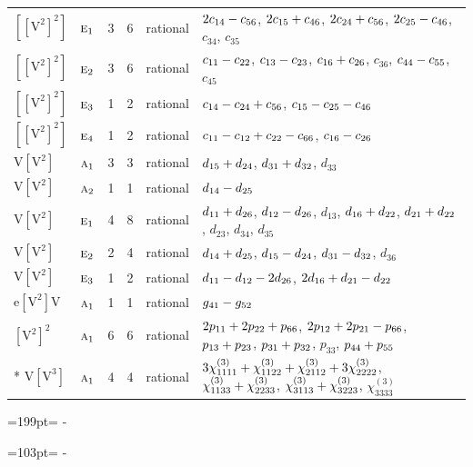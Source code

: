 \documentclass[10pt,a4paper]{article}
\newcommand{\needspace}[1]{\par\penalty-100\begingroup\dimen0=#1\relax\dimen2=\pagegoal
  \advance\dimen2-\pagetotal\ifdim\dimen0>\dimen2\relax\ifdim\dimen2>0pt\vfil\break\fi\fi
  \endgroup}
\numberwithin{equation}{section}
\newcommand{\irr}[1]{\text{\normalfont\scshape #1}}
\newcommand{\jahn}[1]{\mathrm{#1}}
\newlength{\fillwidth}\newlength{\cellwidth}\newlength{\colwidth}
\newcommand{\signbreak}{\penalty100\relax}
\begin{document}
{\begin{longtable}{@{}llrrl>{\RaggedRight\arraybackslash}p{\fillwidth}@{}}
$\jahn{[[V^{2}]^{2}]}$ & $\irr{e}_{1}$ & 3 & 6 & rational & $2c_{14} -\signbreak c_{56}$, $2c_{15} +\signbreak c_{46}$, $2c_{24} +\signbreak c_{56}$, $2c_{25} -\signbreak c_{46}$, $c_{34}$, $c_{35}$\\
$\jahn{[[V^{2}]^{2}]}$ & $\irr{e}_{2}$ & 3 & 6 & rational & $c_{11} -\signbreak c_{22}$, $c_{13} -\signbreak c_{23}$, $c_{16} +\signbreak c_{26}$, $c_{36}$, $c_{44} -\signbreak c_{55}$, $c_{45}$\\
$\jahn{[[V^{2}]^{2}]}$ & $\irr{e}_{3}$ & 1 & 2 & rational & $c_{14} -\signbreak c_{24} +\signbreak c_{56}$, $c_{15} -\signbreak c_{25} -\signbreak c_{46}$\\
$\jahn{[[V^{2}]^{2}]}$ & $\irr{e}_{4}$ & 1 & 2 & rational & $c_{11} -\signbreak c_{12} +\signbreak c_{22} -\signbreak c_{66}$, $c_{16} -\signbreak c_{26}$\\
$\jahn{V[V^{2}]}$ & $\irr{a}_{1}$ & 3 & 3 & rational & $d_{15} +\signbreak d_{24}$, $d_{31} +\signbreak d_{32}$, $d_{33}$\\
$\jahn{V[V^{2}]}$ & $\irr{a}_{2}$ & 1 & 1 & rational & $d_{14} -\signbreak d_{25}$\\
$\jahn{V[V^{2}]}$ & $\irr{e}_{1}$ & 4 & 8 & rational & $d_{11} +\signbreak d_{26}$, $d_{12} -\signbreak d_{26}$, $d_{13}$, $d_{16} +\signbreak d_{22}$, $d_{21} +\signbreak d_{22}$, $d_{23}$, $d_{34}$, $d_{35}$\\
$\jahn{V[V^{2}]}$ & $\irr{e}_{2}$ & 2 & 4 & rational & $d_{14} +\signbreak d_{25}$, $d_{15} -\signbreak d_{24}$, $d_{31} -\signbreak d_{32}$, $d_{36}$\\
$\jahn{V[V^{2}]}$ & $\irr{e}_{3}$ & 1 & 2 & rational & $d_{11} -\signbreak d_{12} -\signbreak 2d_{26}$, $2d_{16} +\signbreak d_{21} -\signbreak d_{22}$\\
$\jahn{e[V^{2}]V}$ & $\irr{a}_{1}$ & 1 & 1 & rational & $\mathnormal{g}_{41} -\signbreak \mathnormal{g}_{52}$\\
$\jahn{[V^{2}]^{2}}$ & $\irr{a}_{1}$ & 6 & 6 & rational & $2p_{11} +\signbreak 2p_{22} +\signbreak p_{66}$, $2p_{12} +\signbreak 2p_{21} -\signbreak p_{66}$, $p_{13} +\signbreak p_{23}$, $p_{31} +\signbreak p_{32}$, $p_{33}$, $p_{44} +\signbreak p_{55}$\\*
$\jahn{V[V^{3}]}$ & $\irr{a}_{1}$ & 4 & 4 & rational & $3\chi^{(3)}_{1111} +\signbreak \chi^{(3)}_{1122} +\signbreak \chi^{(3)}_{2112} +\signbreak 3\chi^{(3)}_{2222}$, $\chi^{(3)}_{1133} +\signbreak \chi^{(3)}_{2233}$, $\chi^{(3)}_{3113} +\signbreak \chi^{(3)}_{3223}$, $\chi^{(3)}_{3333}$\\
\bottomrule\end{longtable}}
\needspace{199pt}
\needspace{103pt}
\end{document}
